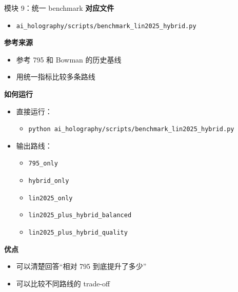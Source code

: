 \documentclass[aspectratio=169,10pt]{ctexbeamer}
\begin{document}
\begin{frame}{模块 9：统一 benchmark}
  \textbf{对应文件}
  \begin{itemize}
    \item \texttt{ai\_holography/scripts/benchmark\_lin2025\_hybrid.py}
  \end{itemize}

  \textbf{参考来源}
  \begin{itemize}
    \item 参考 795 和 Bowman 的历史基线
    \item 用统一指标比较多条路线
  \end{itemize}

  \textbf{如何运行}
  \begin{itemize}
    \item 直接运行：
    \begin{itemize}
      \item \texttt{python ai\_holography/scripts/benchmark\_lin2025\_hybrid.py}
    \end{itemize}
    \item 输出路线：
    \begin{itemize}
      \item \texttt{795\_only}
      \item \texttt{hybrid\_only}
      \item \texttt{lin2025\_only}
      \item \texttt{lin2025\_plus\_hybrid\_balanced}
      \item \texttt{lin2025\_plus\_hybrid\_quality}
    \end{itemize}
  \end{itemize}

  \textbf{优点}
  \begin{itemize}
    \item 可以清楚回答“相对 795 到底提升了多少”
    \item 可以比较不同路线的 trade-off
  \end{itemize}
\end{frame}
\end{document}
